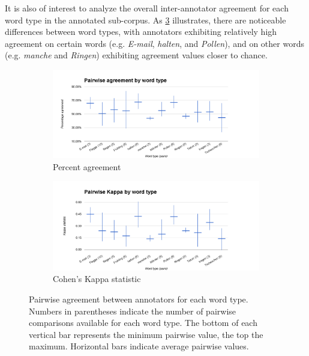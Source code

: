 		It is also of interest to analyze the overall inter-annotator agreement for each word type in the annotated sub-corpus. As \cref{fig:agreement:words} illustrates, there are noticeable differences between word types, with annotators exhibiting relatively high agreement on certain words (e.g. \textit{E-mail}, \textit{halten}, and \textit{Pollen}), and on other words (e.g. \textit{manche} and \textit{Ringen}) exhibiting agreement values closer to chance. 
		
		
		\begin{figure}[htb]
			\centering
			
			\begin{subfigure}[b]{\textwidth}
				\centering
				\includegraphics[width=\textwidth]{img/annotation/pairAgreeWords}
				\caption{Percent agreement}
				\label{fig:agreement:words:pct}
			\end{subfigure}%
			
			\begin{subfigure}[b]{\textwidth}
				\centering
				\includegraphics[width=\textwidth]{img/annotation/pairKappaWords}
				\caption{Cohen's Kappa statistic}
				\label{fig:agreement:words:k}
			\end{subfigure}%
			
			\caption[Pairwise agreement statistics by word type]{Pairwise agreement between annotators for each word type. Numbers in parentheses indicate the number of pairwise comparisons available for each word type. The bottom of each vertical bar represents the minimum pairwise value, the top the maximum. Horizontal bars indicate average pairwise values.}
			\label{fig:agreement:words}
		\end{figure}
		
